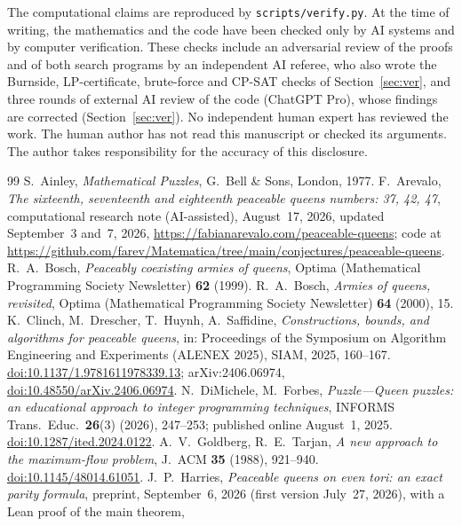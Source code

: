 \documentclass[11pt]{article}
\theoremstyle{remark}
\begin{document}
The computational claims are reproduced by \texttt{scripts/verify.py}. At the time of writing, the
mathematics and the code have been checked only by AI systems and by computer verification. These checks
include an adversarial review of the proofs and of both search programs by an independent AI referee,
who also wrote the Burnside, LP-certificate, brute-force and CP-SAT checks of Section~\ref{sec:ver}, and three
rounds of external AI review of the code (ChatGPT Pro), whose findings are corrected
(Section~\ref{sec:ver}). No
independent human expert has reviewed the work. The human author has not read this manuscript or checked
its arguments. The author takes responsibility for the accuracy of this disclosure.

\raggedright
\begin{thebibliography}{99}
 S.~Ainley, \emph{Mathematical Puzzles}, G.~Bell \& Sons, London, 1977.
 F.~Arevalo, \emph{The sixteenth, seventeenth and eighteenth peaceable queens numbers: 37,
42, 47}, computational research note (AI-assisted), August~17, 2026, updated September~3 and~7, 2026,
\url{https://fabianarevalo.com/peaceable-queens}; code at
\url{https://github.com/farev/Matematica/tree/main/conjectures/peaceable-queens}.
 R.~A.~Bosch, \emph{Peaceably coexisting armies of queens}, Optima (Mathematical
Programming Society Newsletter) \textbf{62} (1999).
 R.~A.~Bosch, \emph{Armies of queens, revisited}, Optima (Mathematical Programming Society
Newsletter) \textbf{64} (2000), 15.
 K.~Clinch, M.~Drescher, T.~Huynh, A.~Saffidine, \emph{Constructions, bounds, and algorithms
for peaceable queens}, in: Proceedings of the Symposium on Algorithm Engineering and Experiments
(ALENEX 2025), SIAM, 2025, 160--167.
\href{https://doi.org/10.1137/1.9781611978339.13}{doi:10.1137/1.9781611978339.13}; arXiv:2406.06974,
\href{https://doi.org/10.48550/arXiv.2406.06974}{doi:10.48550/arXiv.2406.06974}.
 N.~DiMichele, M.~Forbes, \emph{Puzzle---Queen puzzles: an educational approach to integer
programming techniques}, INFORMS Trans.\ Educ.\ \textbf{26}(3) (2026), 247--253; published online
August~1, 2025. \href{https://doi.org/10.1287/ited.2024.0122}{doi:10.1287/ited.2024.0122}.
 A.~V.~Goldberg, R.~E.~Tarjan, \emph{A new approach to the maximum-flow problem}, J.\ ACM
\textbf{35} (1988), 921--940. \href{https://doi.org/10.1145/48014.61051}{doi:10.1145/48014.61051}.
 J.~P.~Harries, \emph{Peaceable queens on even tori: an exact parity formula}, preprint,
September~6, 2026 (first version July~27, 2026), with a Lean proof of the main theorem,

\end{thebibliography}
\end{document}
